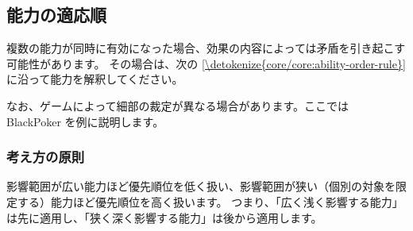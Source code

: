 \documentclass[letterpaper,10pt,dvipdfmx]{sphinxmanual}
\begin{document}
\subsection{能力の適応順}
\label{\detokenize{core/core:ability-order}}\label{\detokenize{core/core:id29}}
\sphinxAtStartPar
複数の能力が同時に有効になった場合、効果の内容によっては矛盾を引き起こす可能性があります。
その場合は、次の \hyperref[\detokenize{core/core:ability-order-rule}]{\ref{\detokenize{core/core:ability-order-rule}} } に沿って能力を解釈してください。

\sphinxAtStartPar
なお、ゲームによって細部の裁定が異なる場合があります。ここでは BlackPoker を例に説明します。


\subsubsection{考え方の原則}
\label{\detokenize{core/core:id30}}
\sphinxAtStartPar
影響範囲が広い能力ほど優先順位を低く扱い、影響範囲が狭い（個別の対象を限定する）能力ほど優先順位を高く扱います。
つまり、「広く浅く影響する能力」は先に適用し、「狭く深く影響する能力」は後から適用します。
\end{document}
